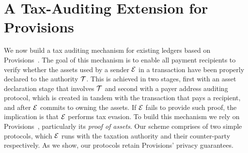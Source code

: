 \section{A Tax-Auditing Extension for Provisions}\label{sec:provisions-extension}

We now build a tax auditing mechanism for existing ledgers based on
Provisions~\cite{CCS:DBBCB15}. The goal of this mechanism is to enable all
payment recipients to verify whether the assets used by a sender $\mathcal{E}$ in
a transaction have been properly declared to the authority $\mathcal{T}$. This is
achieved in two stages, first with an asset declaration stage that involves
$\mathcal{T}$ and second with a payer address auditing protocol, which is created
in tandem with the transaction that pays a recipient, and after $\mathcal{E}$
commits to owning the assets. If $\mathcal{E}$ fails to provide such proof, the
implication is that $\mathcal{E}$ performs tax evasion.  To build this
mechanism we rely on Provisions~\cite{CCS:DBBCB15}, particularly its
\emph{proof of assets}. Our scheme comprises of two simple protocols, which
$\mathcal{E}$ runs with the taxation authority and their counter-party
respectively. As we show, our protocols retain Provisions' privacy guarantees.

